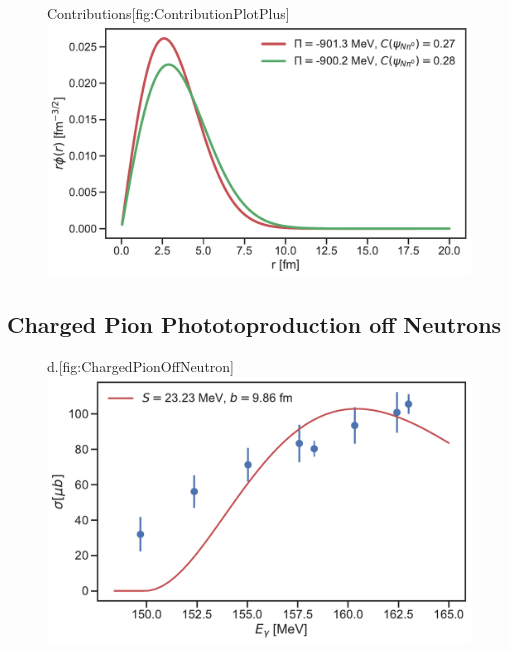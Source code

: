 \begin{figure}[H]
	\begin{sidecaption}{Contributions}[fig:ContributionPlotPlus]
		\includegraphics[width=\linewidth]{Figures/ContributionPlotPiPlus.pdf}
	\end{sidecaption}
\end{figure}
\subsection{Charged Pion Phototoproduction off Neutrons}
\begin{figure}[H]
	\begin{sidecaption}{d.}[fig:ChargedPionOffNeutron]
		\includegraphics[width=\linewidth]{Figures/ChargedPionOffNeutron.pdf}
	\end{sidecaption}
\end{figure}